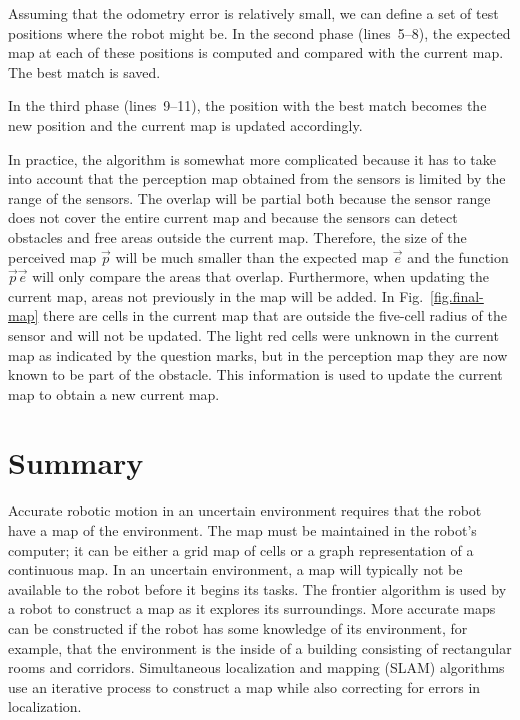 Assuming that the odometry error is relatively small, we can define a set of test positions where the robot might be. In the second phase (lines~5--8), the expected map at each of these positions is computed and compared with the current map. The best match is saved.

In the third phase (lines~9--11), the position with the best match becomes the new position and the current map is updated accordingly.

In practice, the algorithm is somewhat more complicated because it has to take into account that the perception map obtained from the sensors is limited by the range of the sensors. The overlap will be partial both because the sensor range does not cover the entire current map and because the sensors can detect obstacles and free areas outside the current map. Therefore, the size of the perceived map $\vec{p}$ will be much smaller than the expected map $\vec{e}$ and the function $\vec{p}$\p{,}$\vec{e}$\p{)} will only compare the areas that overlap. Furthermore, when updating the current map, areas not previously in the map will be added. In Fig.~\ref{fig.final-map} there are cells in the current map that are outside the five-cell radius of the sensor and will not be updated. The light red cells were unknown in the current map as indicated by the question marks, but in the perception map they are now known to be part of the obstacle. This information is used to update the current map to obtain a new current map.

\section{Summary}

Accurate robotic motion in an uncertain environment requires that the robot have a map of the environment. The map must be maintained in the robot's computer; it can be either a grid map of cells or a graph representation of a continuous map. In an uncertain environment, a map will typically not be available to the robot before it begins its tasks. The frontier algorithm is used by a robot to construct a map as it explores its surroundings. More accurate maps can be constructed if the robot has some knowledge of its environment, for example, that the environment is the inside of a building consisting of rectangular rooms and corridors. Simultaneous localization and mapping (SLAM) algorithms use an iterative process to construct a map while also correcting for errors in localization.

